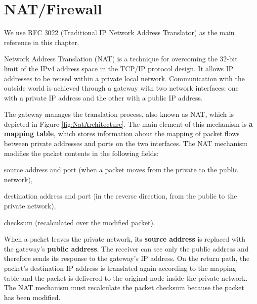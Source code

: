 \chapter{NAT/Firewall}

We use RFC 3022 \cite{RFC-3022-NAT} (Traditional IP Network Address Translator) as the main reference in this chapter.

Network Address Translation (NAT) is a technique for overcoming the 32-bit limit of the IPv4 address space in the TCP/IP protocol design.
It allows IP addresses to be reused within a private local network.
Communication with the outside world is achieved through a gateway with two network interfaces: one with a private IP address and the other with a public IP address.

The gateway manages the translation process, also known as NAT, which is depicted in Figure \ref{fig:NatArchitecture}.
The main element of this mechanism is \textbf{a mapping table}, which stores information about the mapping of packet flows between private addresses and ports on the two interfaces.
The NAT mechanism modifies the packet contents in the following fields:
\begin{paklist}
\item source address and port (when a packet moves from the private to the public network),
\item destination address and port (in the reverse direction, from the public to the private network),
\item checksum (recalculated over the modified packet).
\end{paklist}

When a packet leaves the private network, its \textbf{source address} is replaced with the gateway's \textbf{public address}.
The receiver can see only the public address and therefore sends its response to the gateway's IP address.
On the return path, the packet's destination IP address is translated again according to the mapping table and the packet is delivered to the original node inside the private network.
The NAT mechanism must recalculate the packet checksum because the packet has been modified.

